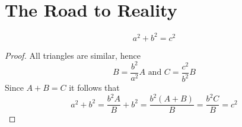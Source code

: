 
\newpage
\section{The Road to Reality}
\begin{theorem}[Pythagoras]\label{thm:thm_pythagoras}

    \[
    a^2 + b^2 = c^2
\]
\end{theorem}

\begin{proof}
All triangles are similar, hence
\[
    B = \frac{b^2}{a^2} A \text{ and }  C =  \frac{c^2}{b^2} B 
\]
Since \( A + B = C \) it follows that
\[
     a^2 + b^2 = \frac{b^2A}{B} + b^2 = \frac{b^2(A + B)}{B} = \frac{b^2 C}{B} = c^2
\]
\end{proof}
\bigskip

